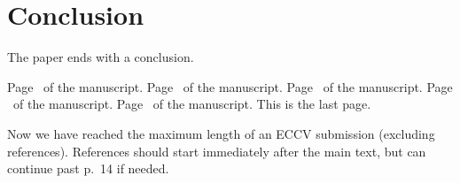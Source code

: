\documentclass[runningheads]{eccv/llncs}
\begin{document}
\section{Conclusion}
The paper ends with a conclusion. 

\clearpage\mbox{}Page \thepage\ of the manuscript.
\clearpage\mbox{}Page \thepage\ of the manuscript.
\clearpage\mbox{}Page \thepage\ of the manuscript.
\clearpage\mbox{}Page \thepage\ of the manuscript.
\clearpage\mbox{}Page \thepage\ of the manuscript. This is the last page.
\par\vfill\par
Now we have reached the maximum length of an ECCV \ECCVyear{} submission (excluding references).
References should start immediately after the main text, but can continue past p.\ 14 if needed.
\clearpage  %


%
%


\end{document}
